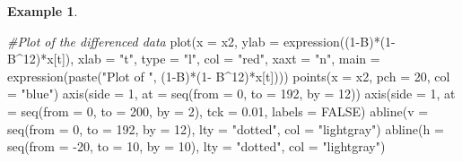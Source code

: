 \documentclass[
]{book}
\newenvironment{Shaded}{\begin{snugshade}}{\end{snugshade}}
\newcommand{\AttributeTok}[1]{\textcolor[rgb]{0.77,0.63,0.00}{#1}}
\newcommand{\CommentTok}[1]{\textcolor[rgb]{0.56,0.35,0.01}{\textit{#1}}}
\newcommand{\ConstantTok}[1]{\textcolor[rgb]{0.00,0.00,0.00}{#1}}
\newcommand{\DecValTok}[1]{\textcolor[rgb]{0.00,0.00,0.81}{#1}}
\newcommand{\FloatTok}[1]{\textcolor[rgb]{0.00,0.00,0.81}{#1}}
\newcommand{\FunctionTok}[1]{\textcolor[rgb]{0.00,0.00,0.00}{#1}}
\newcommand{\NormalTok}[1]{#1}
\newcommand{\SpecialCharTok}[1]{\textcolor[rgb]{0.00,0.00,0.00}{#1}}
\newcommand{\StringTok}[1]{\textcolor[rgb]{0.31,0.60,0.02}{#1}}
\theoremstyle{definition}
\theoremstyle{definition}
\newtheorem{example}{Example}[chapter]
\theoremstyle{definition}
\theoremstyle{definition}
\theoremstyle{remark}
\begin{document}
\begin{example}
\begin{Shaded}
\begin{Highlighting}[]
\CommentTok{\#Plot of the differenced data  }
\FunctionTok{plot}\NormalTok{(}\AttributeTok{x =}\NormalTok{ x2, }\AttributeTok{ylab =} \FunctionTok{expression}\NormalTok{((}\DecValTok{1}\SpecialCharTok{{-}}\NormalTok{B)}\SpecialCharTok{*}\NormalTok{(}\DecValTok{1}\SpecialCharTok{{-}}\NormalTok{B}\SpecialCharTok{\^{}}\DecValTok{12}\NormalTok{)}\SpecialCharTok{*}\NormalTok{x[t]), }
    \AttributeTok{xlab =} \StringTok{"t"}\NormalTok{, }\AttributeTok{type =} \StringTok{"l"}\NormalTok{, }\AttributeTok{col =} \StringTok{"red"}\NormalTok{, }\AttributeTok{xaxt =} \StringTok{"n"}\NormalTok{, }
    \AttributeTok{main =}  \FunctionTok{expression}\NormalTok{(}\FunctionTok{paste}\NormalTok{(}\StringTok{"Plot of "}\NormalTok{, (}\DecValTok{1}\SpecialCharTok{{-}}\NormalTok{B)}\SpecialCharTok{*}\NormalTok{(}\DecValTok{1}\SpecialCharTok{{-}}
\NormalTok{    B}\SpecialCharTok{\^{}}\DecValTok{12}\NormalTok{)}\SpecialCharTok{*}\NormalTok{x[t])))}
\FunctionTok{points}\NormalTok{(}\AttributeTok{x =}\NormalTok{ x2, }\AttributeTok{pch =} \DecValTok{20}\NormalTok{, }\AttributeTok{col =} \StringTok{"blue"}\NormalTok{)}
\FunctionTok{axis}\NormalTok{(}\AttributeTok{side =} \DecValTok{1}\NormalTok{, }\AttributeTok{at =} \FunctionTok{seq}\NormalTok{(}\AttributeTok{from =} \DecValTok{0}\NormalTok{, }\AttributeTok{to =} \DecValTok{192}\NormalTok{, }\AttributeTok{by =} \DecValTok{12}\NormalTok{)) }
\FunctionTok{axis}\NormalTok{(}\AttributeTok{side =} \DecValTok{1}\NormalTok{, }\AttributeTok{at =} \FunctionTok{seq}\NormalTok{(}\AttributeTok{from =} \DecValTok{0}\NormalTok{, }\AttributeTok{to =} \DecValTok{200}\NormalTok{, }\AttributeTok{by =} \DecValTok{2}\NormalTok{), }
    \AttributeTok{tck =} \FloatTok{0.01}\NormalTok{, }\AttributeTok{labels =} \ConstantTok{FALSE}\NormalTok{) }
\FunctionTok{abline}\NormalTok{(}\AttributeTok{v =} \FunctionTok{seq}\NormalTok{(}\AttributeTok{from =} \DecValTok{0}\NormalTok{, }\AttributeTok{to =} \DecValTok{192}\NormalTok{, }\AttributeTok{by =} \DecValTok{12}\NormalTok{), }\AttributeTok{lty =} 
    \StringTok{"dotted"}\NormalTok{, }\AttributeTok{col =} \StringTok{"lightgray"}\NormalTok{)}
\FunctionTok{abline}\NormalTok{(}\AttributeTok{h =} \FunctionTok{seq}\NormalTok{(}\AttributeTok{from =} \SpecialCharTok{{-}}\DecValTok{20}\NormalTok{, }\AttributeTok{to =} \DecValTok{10}\NormalTok{, }\AttributeTok{by =} \DecValTok{10}\NormalTok{), }\AttributeTok{lty =} 
    \StringTok{"dotted"}\NormalTok{, }\AttributeTok{col =} \StringTok{"lightgray"}\NormalTok{)}
\end{Highlighting}
\end{Shaded}


\end{example}
\end{document}
